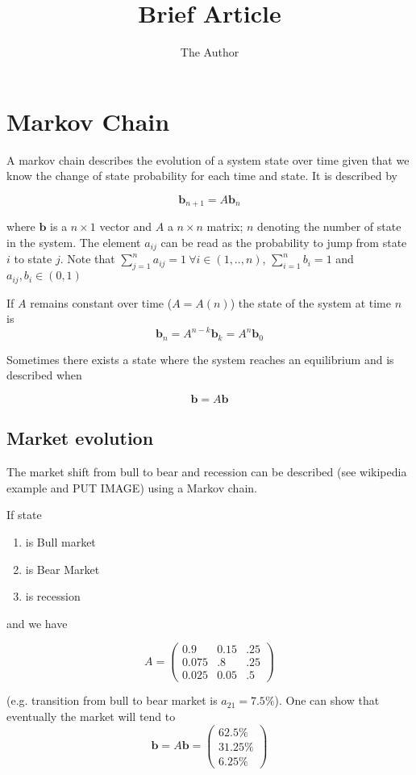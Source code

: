 \documentclass[11pt]{article} %
\title{Brief Article}
\author{The Author}
\begin{document}
\maketitle
\section{Markov Chain}

A markov chain describes the evolution of a system state over time given that we know the change of state probability for each time and state. It is described by 

\begin{equation}
\mathbf{b}_{n+1} = A\mathbf{b}_{n}
\end{equation}

where $\mathbf{b}$ is a $n\times 1$ vector and $A$ a $n\times n$ matrix; $n$ denoting the number of state in the system. The element $a_{ij}$ can be read as the probability to jump from state $i$ to state $j$. Note that $\sum_{j=1}^n a_{ij}=1~\forall i\in(1, .., n)$, $\sum_{i=1}^nb_i=1$ and $a_{ij},b_i\in(0,1)$ 

If $A$ remains constant over time ($A=A(n)$) the state of the system at time $n$ is
\begin{equation}
\mathbf{b}_n = A^{n-k}\mathbf{b}_k= A^n\mathbf{b}_0
\end{equation}

Sometimes there exists a state where the system reaches an equilibrium and is described when

\begin{equation}
\mathbf{b} = A\mathbf{b}
\end{equation}

\subsection{Market evolution}

The market shift from bull to bear and recession can be described (see wikipedia example and PUT IMAGE) using a Markov chain.

If state 
\begin{enumerate}
\item is Bull market
\item is Bear Market
\item is recession
\end{enumerate}
and we have

\begin{equation}
A =
\begin{pmatrix}
0.9	& 0.15	& .25 \\
0.075	& .8		& .25\\
0.025 & 0.05		& .5
\end{pmatrix}
\end{equation}

(e.g. transition from bull to bear market is $a_{21}=7.5\%$). One can show that eventually the market will tend to
\begin{equation}
\mathbf{b} = A\mathbf{b} = 
\begin{pmatrix}
62.5\%\\
31.25\%\\
6.25\%
\end{pmatrix}
\end{equation}
\end{document}
